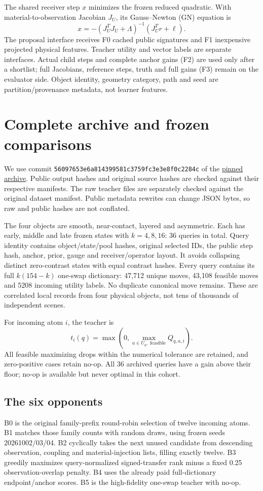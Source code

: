 \documentclass[11pt,a4paper]{article}
\newcommand{\code}[1]{\texttt{#1}}
\begin{document}
The shared receiver step $x$ minimizes the frozen reduced quadratic. With material-to-observation Jacobian $J_U$, its Gauss--Newton (GN) equation is
\[
 x=-(J_U^TJ_U+\Lambda)^{-1}(J_U^Tr+\ell).
\]
The proposal interface receives F0 cached public signatures and F1 inexpensive projected physical features. Teacher utility and vector labels are separate interfaces. Actual child steps and complete anchor gains (F2) are used only after a shortlist; full Jacobians, reference steps, truth and full gains (F3) remain on the evaluator side. Object identity, geometry category, path and seed are partition/provenance metadata, not learner features.

\section{Complete archive and frozen comparisons}
We use commit \code{56097653e6a814399581c3759fc3e3e8f0c2284c} of the \href{https://github.com/migodam/a17-maxwell-certified-exchange/tree/56097653e6a814399581c3759fc3e3e8f0c2284c}{pinned archive}. Public output hashes and original source hashes are checked against their respective manifests. The raw teacher files are separately checked against the original dataset manifest. Public metadata rewrites can change JSON bytes, so raw and public hashes are not conflated.

The four objects are smooth, near-contact, layered and asymmetric. Each has early, middle and late frozen states with $k=4,8,16$: 36 queries in total. Query identity contains object/state/pool hashes, original selected IDs, the public step hash, anchor, prior, gauge and receiver/operator layout. It avoids collapsing distinct zero-contrast states with equal contrast hashes. Every query contains its full $k(154-k)$ one-swap dictionary: 47,712 unique moves, 43,108 feasible moves and 5208 incoming utility labels. No duplicate canonical move remains. These are correlated local records from four physical objects, not tens of thousands of independent scenes.

For incoming atom $i$, the teacher is
\begin{equation}
t_i(q)=\max\!\left(0,\max_{a\in U_q,\;\mathrm{feasible}} Q_{q,a,i}\right).
\end{equation}
All feasible maximizing drops within the numerical tolerance are retained, and zero-positive cases retain no-op. All 36 archived queries have a gain above their floor; no-op is available but never optimal in this cohort.

\subsection{The six opponents}
B0 is the original family-prefix round-robin selection of twelve incoming atoms. B1 matches those family counts with random draws, using frozen seeds 20261002/03/04. B2 cyclically takes the next unused candidate from descending observation, coupling and material-injection lists, filling exactly twelve. B3 greedily maximizes query-normalized signed-transfer rank minus a fixed 0.25 observation-overlap penalty. B4 uses the already paid full-dictionary endpoint/anchor scores. B5 is the high-fidelity one-swap teacher with no-op.
\end{document}
